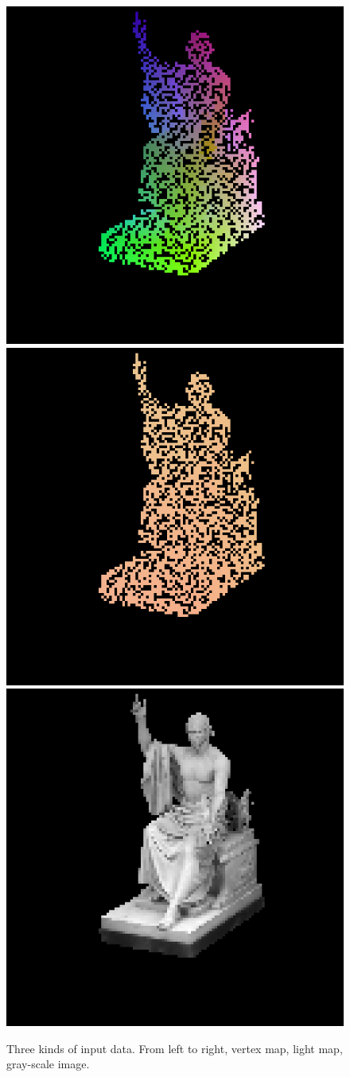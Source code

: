 \begin{figure}[H]
	\centering
	\captionsetup{width=\linewidth}
	{\includegraphics[width=.32\textwidth]{./Figures/intrinsic_image_vertex_input.png}}
	{\includegraphics[width=.32\textwidth]{./Figures/intrinsic_image_light_input.png}}
	{\includegraphics[width=.32\textwidth]{./Figures/intrinsic_image.png}}
	\decoRule
	\caption{Three kinds of input data. From left to right, vertex map, light map, gray-scale image.}
	\label{fig:light-input}
\end{figure}


